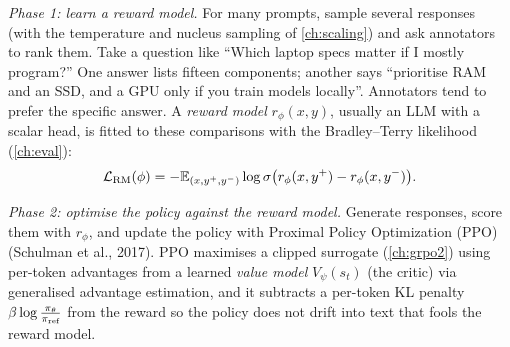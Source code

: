\emph{Phase 1: learn a reward model.} For many prompts, sample several responses (with the
temperature and nucleus sampling of \cref{ch:scaling}) and ask annotators to rank them.
Take a question like ``Which laptop specs matter if I mostly program?'' One answer lists
fifteen components; another says ``prioritise RAM and an SSD, and a GPU only if you train
models locally''. Annotators tend to prefer the specific answer. A \emph{reward model}
$r_\phi(x,y)$, usually an LLM with a scalar head, is fitted to these comparisons with the
Bradley--Terry likelihood (\cref{ch:eval}):
\begin{equation}
\mathcal{L}_{\text{RM}}(\phi)=-\mathbb{E}_{(x,y^+,y^-)}\log\sigma\big(r_\phi(x,y^+)-r_\phi(x,y^-)\big).
\end{equation}

\emph{Phase 2: optimise the policy against the reward model.} Generate responses, score
them with $r_\phi$, and update the policy with Proximal Policy Optimization (PPO)
(Schulman et al., 2017). PPO maximises a clipped surrogate (\cref{ch:grpo2})
using per-token advantages from a learned \emph{value model} $V_\psi(s_t)$ (the critic)
via generalised advantage estimation, and it subtracts a per-token KL penalty
$\beta\log\frac{\pi_\theta}{\pi_{\text{ref}}}$ from the reward so the policy does not drift into text
that fools the reward model.

